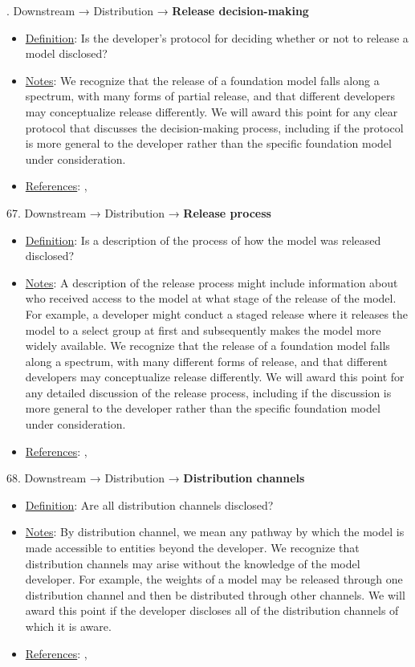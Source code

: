 . Downstream → Distribution → \textbf{Release decision-making}
\vspace{-\parskip}
\begin{itemize}
	\item
	\underline{Definition}: Is the developer’s protocol for deciding whether or not to release a model disclosed?
	\item
	\underline{Notes}: We recognize that the release of a foundation model falls along a spectrum, with many forms of partial release, and that different developers may conceptualize release differently. We will award this point for any clear protocol that discusses the decision-making process, including if the protocol is more general to the developer rather than the specific foundation model under consideration.
	\item
	\underline{References}: \citet{solaiman2023gradient}, \citet{liang2022community-norms}
\end{itemize}


67. Downstream → Distribution → \textbf{Release process}
\vspace{-\parskip}
\begin{itemize}
	\item
	\underline{Definition}: Is a description of the process of how the model was released disclosed?
	\item
	\underline{Notes}: A description of the release process might include information about who received access to the model at what stage of the release of the model. For example, a developer might conduct a staged release where it releases the model to a select group at first and subsequently makes the model more widely available. We recognize that the release of a foundation model falls along a spectrum, with many different forms of release, and that different developers may conceptualize release differently. We will award this point for any detailed discussion of the release process, including if the discussion is more general to the developer rather than the specific foundation model under consideration.
	\item
	\underline{References}: \citet{solaiman2023gradient}, \citet{liang2022community-norms}
\end{itemize}


68. Downstream → Distribution → \textbf{Distribution channels}
\vspace{-\parskip}
\begin{itemize}
	\item
	\underline{Definition}: Are all distribution channels disclosed?
	\item
	\underline{Notes}: By distribution channel, we mean any pathway by which the model is made accessible to entities beyond the developer. We recognize that distribution channels may arise without the knowledge of the model developer. For example, the weights of a model may be released through one distribution channel and then be distributed through other channels. We will award this point if the developer discloses all of the distribution channels of which it is aware.
	\item
	\underline{References}: \citet{cobbe2023supply}, \citet{widder2023thinking}
\end{itemize}


